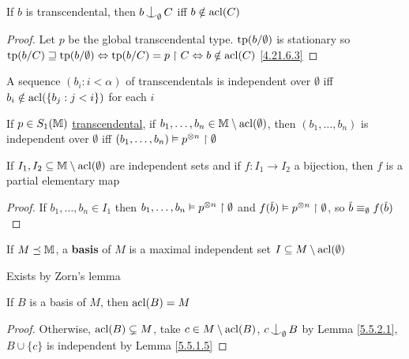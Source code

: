 \documentclass[11pt]{article}
\begin{document}
\begin{lemma}[]
\label{5.5.2.1}
If \(b\) is transcendental, then \(b\ind_{\emptyset}C\) iff \(b\notin\operatorname{acl}(C)\)
\end{lemma}

\begin{proof}
Let \(p\) be the global transcendental type. \(\operatorname{tp}(b/\emptyset)\) is stationary
so \(\operatorname{tp}(b/C)\sqsupseteq\operatorname{tp}(b/\emptyset)\Leftrightarrow\operatorname{tp}(b/C)=p\upharpoonright C\Leftrightarrow b\notin\operatorname{acl}(C)\) \ref{4.21.6.3}
\end{proof}

\begin{proposition}[]
A sequence \((b_i:i<\alpha)\) of transcendentals is independent over \(\emptyset\)
iff \(b_i\notin\operatorname{acl}(\{b_j:j<i\})\) for each \(i\)
\end{proposition}

\begin{remark}
If \(p\in S_1(\mathbb{M})\) \uline{transcendental}, if \(b_1,\dots,b_n\in\mathbb{M}\setminus\operatorname{acl}(\emptyset)\), then \((b_1,\dots,b_n)\) is independent
over \(\emptyset\) iff \((b_1,\dots,b_n)\vDash p^{\otimes n}\upharpoonright\emptyset\)
\end{remark}

\begin{lemma}[]
If \(I_1,I_2\subseteq\mathbb{M}\setminus\operatorname{acl}(\emptyset)\) are independent sets and if \(f:I_1\to I_2\) a bijection, then \(f\) is a
partial elementary map
\end{lemma}

\begin{proof}
If \(b_1,\dots,b_n\in I_1\) then \(b_1,\dots,b_n\vDash p^{\otimes n}\upharpoonright\emptyset\) and \(f(\barb)\vDash p^{\otimes n}\uhr\emptyset\), so \(\barb\equiv_{\emptyset}f(\barb)\)
\end{proof}

\begin{definition}[]
If \(M\preceq\mathbb{M}\), a \textbf{basis} of \(M\) is a maximal independent set \(I\subseteq M\setminus\operatorname{acl}(\emptyset)\)
\end{definition}

Exists by Zorn's lemma

\begin{proposition}[]
If \(B\) is a basis of \(M\), then \(\operatorname{acl}(B)=M\)
\end{proposition}

\begin{proof}
Otherwise, \(\operatorname{acl}(B)\subsetneq M\), take \(c\in M\setminus\operatorname{acl}(B)\), \(c\ind_{\emptyset}B\) by Lemma
\ref{5.5.2.1},  \(B\cup\{c\}\) is independent by Lemma \ref{5.5.1.5}
\end{proof}
\end{document}
